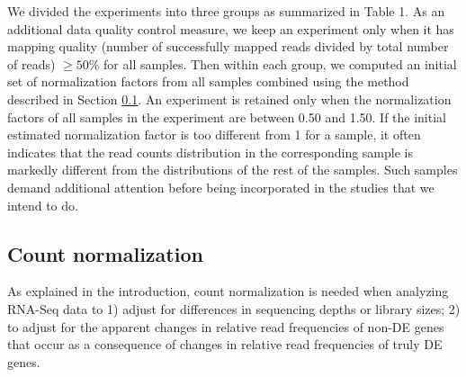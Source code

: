 \documentclass[letterpaper,12pt]{article}
\begin{document}


We divided the experiments into three groups as summarized in Table 1.  As an
additional data quality control measure,  we keep an experiment only when it 
has mapping quality (number of successfully mapped reads divided by total number of reads) $\geq 
50\%$ for all samples.
Then within each group, we computed an
initial set of normalization factors from all samples combined using the method
described in Section \ref{section:countNormalization}.  An experiment is
retained only when the normalization factors of all samples in the experiment
are between 0.50 and 1.50.  If the initial estimated normalization factor is
too different from 1 for a sample, it often indicates that the read counts
distribution in the corresponding sample is markedly different from the
distributions of the rest of the samples. Such samples demand additional
attention before being incorporated in the studies that we intend to do.



\subsection{Count normalization}\label{section:countNormalization}
As explained in the introduction, count normalization is needed when analyzing RNA-Seq data to
1) adjust for differences in sequencing depths or
library sizes; 2) to adjust for the apparent changes in relative read
frequencies of non-DE genes that occur as a consequence of changes in relative read frequencies of 
truly DE genes.
\end{document}
